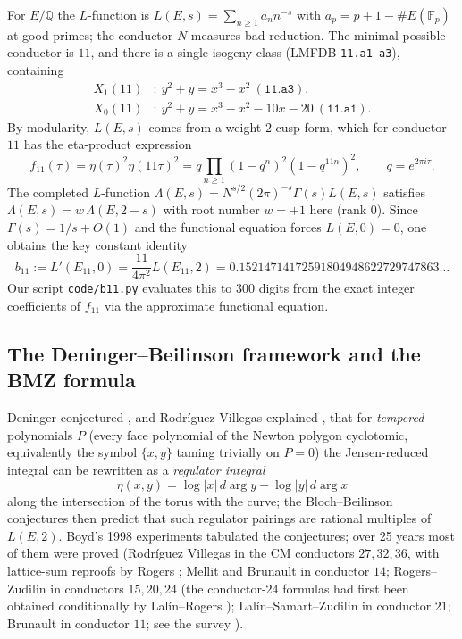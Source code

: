 \documentclass[preprint,12pt]{elsarticle}
\theoremstyle{definition}
\theoremstyle{remark}
\newcommand{\Q}{\mathbb{Q}}
\begin{document}
For $E/\Q$ the $L$-function is $L(E,s)=\sum_{n\ge1}a_n n^{-s}$ with
$a_p=p+1-\#E(\mathbb{F}_p)$ at good primes; the conductor $N$ measures bad
reduction. The minimal possible conductor is $11$, and there is a single
isogeny class (LMFDB \cite{LMFDB} \texttt{11.a1--a3}), containing
\[
\begin{aligned}
  X_1(11)&:\ y^2+y=x^3-x^2\ (\texttt{11.a3}),\\
  X_0(11)&:\ y^2+y=x^3-x^2-10x-20\ (\texttt{11.a1}).
\end{aligned}
\]
By modularity, $L(E,s)$ comes from a weight-$2$ cusp form, which for
conductor $11$ has the eta-product expression
\[
  f_{11}(\tau)=\eta(\tau)^2\eta(11\tau)^2
  =q\prod_{n\ge1}(1-q^n)^2(1-q^{11n})^2,\qquad q=e^{2\pi i\tau}.
\]
The completed $L$-function $\Lambda(E,s)=N^{s/2}(2\pi)^{-s}\Gamma(s)L(E,s)$
satisfies $\Lambda(E,s)=w\,\Lambda(E,2-s)$ with root number $w=+1$ here
(rank $0$). Since $\Gamma(s)=1/s+O(1)$ and the functional equation forces
$L(E,0)=0$, one obtains the key constant identity
\[
  b_{11}:=L'(E_{11},0)=\frac{11}{4\pi^2}L(E_{11},2)
  =0.15214714172591804948622729747863\ldots
\]
Our script \texttt{code/b11.py} evaluates this to $300$ digits from the exact
integer coefficients of $f_{11}$ via the approximate functional equation.

\subsection{The Deninger--Beilinson framework and the BMZ formula}

Deninger conjectured \cite{Deninger}, and Rodr\'iguez Villegas explained
\cite{RV}, that for
\emph{tempered} polynomials $P$ (every face polynomial of the Newton polygon
cyclotomic, equivalently the symbol $\{x,y\}$ taming trivially on $P=0$) the
Jensen-reduced integral can be rewritten as a \emph{regulator integral}
\[
  \eta(x,y)=\log|x|\,d\arg y-\log|y|\,d\arg x
\]
along the intersection of the torus with the curve; the Bloch--Beilinson
conjectures then predict that such regulator pairings are rational multiples
of $L(E,2)$. Boyd's 1998 experiments \cite{Boyd98} tabulated the conjectures;
over 25 years most of them were proved (Rodr\'iguez Villegas \cite{RV} in the
CM conductors $27,32,36$, with lattice-sum reproofs by Rogers \cite{Rogers};
Mellit \cite{Mellit} and Brunault in conductor $14$; Rogers--Zudilin
\cite{RZ14,RZ15} in conductors $15,20,24$ (the conductor-$24$ formulas had
first been obtained conditionally by Lal\'in--Rogers \cite{LR07});
Lal\'in--Samart--Zudilin \cite{LSZ} in conductor $21$;
Brunault \cite{Brunault,BrunaultBSMF} in conductor $11$; see the survey
\cite{BertinLalin}).
\end{document}
